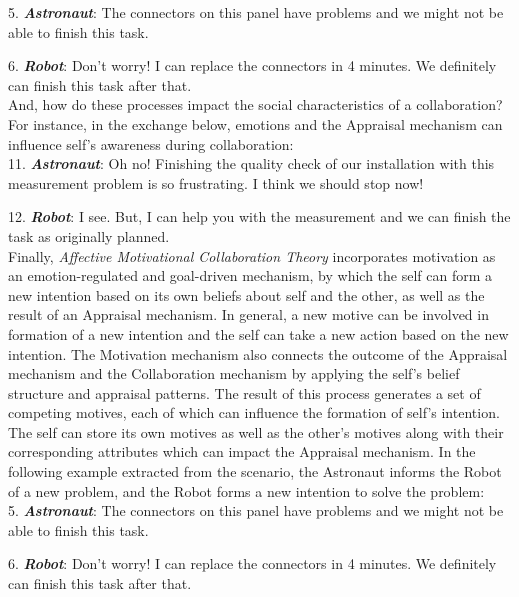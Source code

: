 \documentclass[12pt]{report}
\begin{document}
  5. \textbf{\textit{Astronaut}}: The connectors on this panel have problems and
  we might not be able to finish this task.

  6. \textbf{\textit{Robot}}: Don't worry! I can replace the connectors in 4
  minutes. We definitely can finish this task after that.\\

And, how do these processes impact the social characteristics of a
collaboration? For instance, in the exchange below, emotions and the Appraisal
mechanism can influence self's awareness during collaboration:\\

  11. \textbf{\textit{Astronaut}}: Oh no! Finishing the quality check of our
  installation with this measurement problem is so frustrating. I think we
  should stop now!

  12. \textbf{\textit{Robot}}: I see. But, I can help you with the measurement
  and we can finish the task as originally planned.\\

Finally, \textit{Affective Motivational Collaboration Theory} incorporates
motivation as an emotion-regulated and goal-driven mechanism, by which the self
can form a new intention based on its own beliefs about self and the other, as
well as the result of an Appraisal mechanism. In general, a new motive can
be involved in formation of a new intention and the self can take a new action
based on the new intention. The Motivation mechanism also connects the outcome
of the Appraisal mechanism and the Collaboration mechanism by applying the
self's belief structure and appraisal patterns. The result of this process
generates a set of competing motives, each of which can influence the
formation of self's intention. The self can store its own motives as well as the
other's motives along with their corresponding attributes which can impact the
Appraisal mechanism. In the following example extracted from the scenario, the
Astronaut informs the Robot of a new problem, and the Robot forms a new
intention to solve the problem:\\

  5. \textbf{\textit{Astronaut}}: The connectors on this panel have problems and
  we might not be able to finish this task.

  6. \textbf{\textit{Robot}}: Don't worry! I can replace the connectors in 4
  minutes. We definitely can finish this task after that.\\
  
\end{document}
